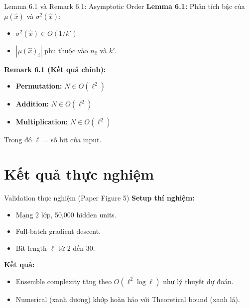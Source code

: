 \begin{frame}{Lemma 6.1 và Remark 6.1: Asymptotic Order}
  \textbf{Lemma 6.1:} Phân tích bậc của $\mu(\hat{x})$ và $\sigma^2(\hat{x})$:
  \begin{itemize}
    \item $\sigma^2(\hat{x}) \in O(1/k')$
    \item $|\mu(\hat{x})_i|$ phụ thuộc vào $n_{\hat{x}}$ và $k'$.
  \end{itemize}

  \vspace{0.3cm}
  \textbf{Remark 6.1 (Kết quả chính):}
  \begin{itemize}
    \item \textbf{Permutation:} $N \in O(\ell^2)$
    \item \textbf{Addition:} $N \in O(\ell^2)$
    \item \textbf{Multiplication:} $N \in O(\ell^2)$
  \end{itemize}

  Trong đó $\ell$ = số bit của input.
\end{frame}

\section{Kết quả thực nghiệm}

\begin{frame}{Validation thực nghiệm (Paper Figure 5)}
  \textbf{Setup thí nghiệm:}
  \begin{itemize}
    \item Mạng 2 lớp, 50,000 hidden units.
    \item Full-batch gradient descent.
    \item Bit length $\ell$ từ 2 đến 30.
  \end{itemize}

  \vspace{0.3cm}
  \textbf{Kết quả:}
  \begin{itemize}
    \item Ensemble complexity tăng theo $O(\ell^2 \log \ell)$ như lý thuyết dự đoán.
    \item Numerical (xanh dương) khớp hoàn hảo với Theoretical bound (xanh lá).
  \end{itemize}
\end{frame}

